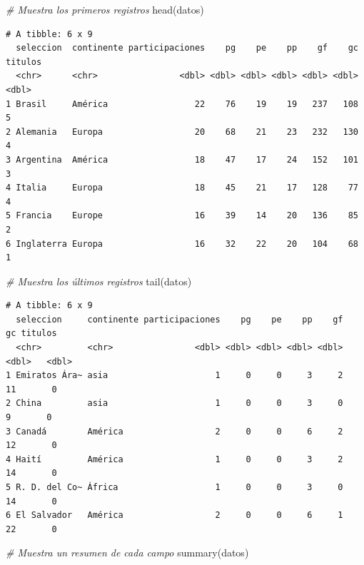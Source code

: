 \documentclass[
]{book}
\newenvironment{Shaded}{\begin{snugshade}}{\end{snugshade}}
\newcommand{\CommentTok}[1]{\textcolor[rgb]{0.56,0.35,0.01}{\textit{#1}}}
\newcommand{\FunctionTok}[1]{\textcolor[rgb]{0.00,0.00,0.00}{#1}}
\newcommand{\NormalTok}[1]{#1}
\begin{document}
\begin{Shaded}
\begin{Highlighting}[]
\CommentTok{\# Muestra los primeros registros}
\FunctionTok{head}\NormalTok{(datos)}
\end{Highlighting}
\end{Shaded}

\begin{verbatim}
# A tibble: 6 x 9
  seleccion  continente participaciones    pg    pe    pp    gf    gc titulos
  <chr>      <chr>                <dbl> <dbl> <dbl> <dbl> <dbl> <dbl>   <dbl>
1 Brasil     América                 22    76    19    19   237   108       5
2 Alemania   Europa                  20    68    21    23   232   130       4
3 Argentina  América                 18    47    17    24   152   101       3
4 Italia     Europa                  18    45    21    17   128    77       4
5 Francia    Europe                  16    39    14    20   136    85       2
6 Inglaterra Europa                  16    32    22    20   104    68       1
\end{verbatim}

\begin{Shaded}
\begin{Highlighting}[]
\CommentTok{\# Muestra los últimos registros}
\FunctionTok{tail}\NormalTok{(datos)}
\end{Highlighting}
\end{Shaded}

\begin{verbatim}
# A tibble: 6 x 9
  seleccion     continente participaciones    pg    pe    pp    gf    gc titulos
  <chr>         <chr>                <dbl> <dbl> <dbl> <dbl> <dbl> <dbl>   <dbl>
1 Emiratos Ára~ asia                     1     0     0     3     2    11       0
2 China         asia                     1     0     0     3     0     9       0
3 Canadá        América                  2     0     0     6     2    12       0
4 Haití         América                  1     0     0     3     2    14       0
5 R. D. del Co~ África                   1     0     0     3     0    14       0
6 El Salvador   América                  2     0     0     6     1    22       0
\end{verbatim}

\begin{Shaded}
\begin{Highlighting}[]
\CommentTok{\# Muestra un resumen de cada campo}
\FunctionTok{summary}\NormalTok{(datos)}
\end{Highlighting}
\end{Shaded}
\end{document}

